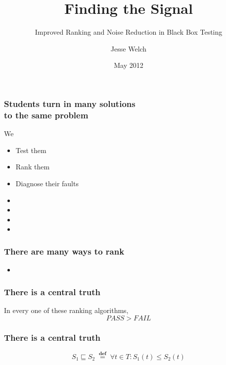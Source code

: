 \documentclass[svgnames,14pt]{beamer}
\title{Finding the Signal}
\subtitle{Improved Ranking and Noise Reduction in Black Box Testing}
\author{Jesse Welch}
\date{May 2012}
\newcommand\fail{\mathit{FAIL}}
\newcommand\pass{\mathit{PASS}}
\newcommand\defined{\mathrel{\;\stackrel{\scriptscriptstyle\mathbf{def}}{=}\;}}
\theoremstyle{definition}
\begin{document}
\begin{frame}
\maketitle
\end{frame}


\begin{frame}
\frametitle{Students turn in many solutions \\ to the same problem}
We 
\begin{itemize}
\item Test them \only<2->{\textbf{cheaply}}
\item Rank them 
\item Diagnose their faults 
\end{itemize}
\end{frame}

\begin{frame}
\begin{itemize}
\frametitle{Overview}
\item {}
\item {}
\item {}
\item {}
\end{itemize}
\end{frame}

\begin{frame}
\frametitle{There are many ways to rank}
\begin{itemize}
\item {}
\end{itemize}
\end{frame}

\begin{frame}
\frametitle{There is a central truth}
In every one of these ranking algorithms,
$$\pass>\fail$$
\end{frame}

\begin{frame}
\frametitle{There is a central truth}
\begin{block}{}
$$S_1 \sqsubseteq S_2 \defined \forall t \in T : S_1(t) \leq S_2(t)$$
\end{block}
\end{frame}
\end{document}
